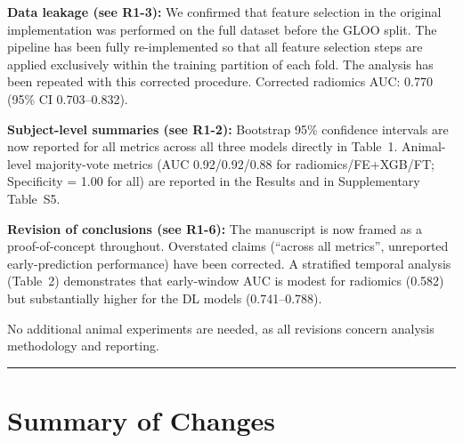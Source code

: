 \documentclass[12pt]{article}
\begin{document}
\textbf{Data leakage (see R1-3):} We confirmed that feature selection in the original implementation was performed on the full dataset before the GLOO split. The pipeline has been fully re-implemented so that all feature selection steps are applied exclusively within the training partition of each fold. The analysis has been repeated with this corrected procedure. Corrected radiomics AUC: 0.770 (95\% CI 0.703--0.832).

\textbf{Subject-level summaries (see R1-2):} Bootstrap 95\% confidence intervals are now reported for all metrics across all three models directly in Table~1. Animal-level majority-vote metrics (AUC 0.92/0.92/0.88 for radiomics/FE+XGB/FT; Specificity = 1.00 for all) are reported in the Results and in Supplementary Table~S5.

\textbf{Revision of conclusions (see R1-6):} The manuscript is now framed as a proof-of-concept throughout. Overstated claims (``across all metrics'', unreported early-prediction performance) have been corrected. A stratified temporal analysis (Table~2) demonstrates that early-window AUC is modest for radiomics (0.582) but substantially higher for the DL models (0.741--0.788).

No additional animal experiments are needed, as all revisions concern analysis methodology and reporting.

\vspace{18pt}\hrule\vspace{18pt}

\vspace{6pt}%
\section*{Summary of Changes}
\end{document}
